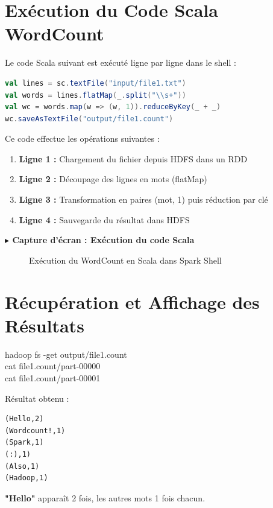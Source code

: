 \documentclass[12pt,a4paper]{report}
\newcommand{\etape}[1]{\vspace{6pt}\textbf{\color{bleuESP}$\blacktriangleright$ #1}\vspace{4pt}}
\begin{document}
\section{Exécution du Code Scala WordCount}

Le code Scala suivant est exécuté ligne par ligne dans le shell :

\begin{lstlisting}[language=scala, caption=WordCount en Scala]
val lines = sc.textFile("input/file1.txt")
val words = lines.flatMap(_.split("\\s+"))
val wc = words.map(w => (w, 1)).reduceByKey(_ + _)
wc.saveAsTextFile("output/file1.count")
\end{lstlisting}

Ce code effectue les opérations suivantes :
\begin{enumerate}
  \item \textbf{Ligne 1 :} Chargement du fichier depuis HDFS dans un RDD
  \item \textbf{Ligne 2 :} Découpage des lignes en mots (flatMap)
  \item \textbf{Ligne 3 :} Transformation en paires (mot, 1) puis réduction par clé
  \item \textbf{Ligne 4 :} Sauvegarde du résultat dans HDFS
\end{enumerate}

\etape{Capture d'écran : Exécution du code Scala}
\begin{figure}[H]
  \centering
  \caption{Exécution du WordCount en Scala dans Spark Shell}
\end{figure}

\section{Récupération et Affichage des Résultats}

\begin{cmdbox}
hadoop fs -get output/file1.count \\
cat file1.count/part-00000 \\
cat file1.count/part-00001
\end{cmdbox}

\begin{successbox}
Résultat obtenu :
\begin{verbatim}
(Hello,2)
(Wordcount!,1)
(Spark,1)
(:),1)
(Also,1)
(Hadoop,1)
\end{verbatim}
\textbf{"Hello"} apparaît 2 fois, les autres mots 1 fois chacun.
\end{successbox}
\end{document}
